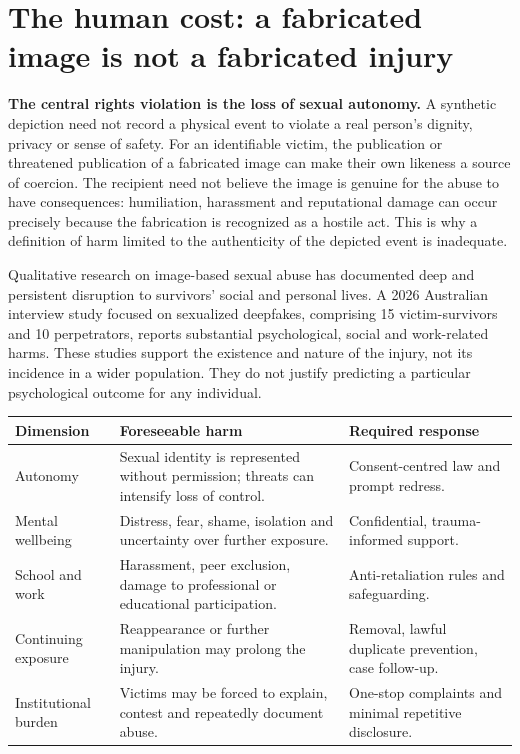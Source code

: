 \documentclass[10pt,a4paper]{article}
\begin{document}
\section{The human cost: a fabricated image is not a fabricated injury}
\textbf{The central rights violation is the loss of sexual autonomy.} A synthetic depiction need not record a physical event to violate a real person's dignity, privacy or sense of safety. For an identifiable victim, the publication or threatened publication of a fabricated image can make their own likeness a source of coercion. The recipient need not believe the image is genuine for the abuse to have consequences: humiliation, harassment and reputational damage can occur precisely because the fabrication is recognized as a hostile act. This is why a definition of harm limited to the authenticity of the depicted event is inadequate.

Qualitative research on image-based sexual abuse has documented deep and persistent disruption to survivors' social and personal lives. A 2026 Australian interview study focused on sexualized deepfakes, comprising 15 victim-survivors and 10 perpetrators, reports substantial psychological, social and work-related harms. These studies support the existence and nature of the injury, not its incidence in a wider population. They do not justify predicting a particular psychological outcome for any individual. \cite{survivors,deepfakeimpact}

\begin{center}\small\begin{tabularx}{\linewidth}{@{}YYY@{}}\toprule
\textbf{Dimension} & \textbf{Foreseeable harm} & \textbf{Required response}\\\midrule
Autonomy & Sexual identity is represented without permission; threats can intensify loss of control. & Consent-centred law and prompt redress.\\
Mental wellbeing & Distress, fear, shame, isolation and uncertainty over further exposure. & Confidential, trauma-informed support.\\
School and work & Harassment, peer exclusion, damage to professional or educational participation. & Anti-retaliation rules and safeguarding.\\
Continuing exposure & Reappearance or further manipulation may prolong the injury. & Removal, lawful duplicate prevention, case follow-up.\\
Institutional burden & Victims may be forced to explain, contest and repeatedly document abuse. & One-stop complaints and minimal repetitive disclosure.\\\bottomrule\end{tabularx}\end{center}
\end{document}
